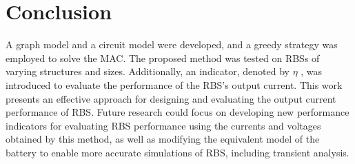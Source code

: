 \documentclass{article}
\begin{document}
\section{Conclusion}

A graph model and a circuit model were developed, and a greedy strategy was employed to solve the MAC. 
The proposed method was tested on RBSs of varying structures and sizes. 
Additionally, an indicator, denoted by $\eta$ , was introduced to evaluate the performance of the RBS's output current. 
This work presents an effective approach for designing and evaluating the output current performance of RBS. 
Future research could focus on developing new performance indicators for evaluating RBS performance using the currents and voltages obtained by this method, as well as modifying the equivalent model of the battery to enable more accurate simulations of RBS, including transient analysis.



\end{document}
